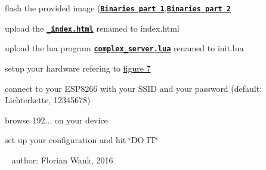\begin{DoxyItemize}
\item flash the provided image (\href{0x00000.bin}{\tt {\bfseries Binaries part 1}},\href{0x10000.bin}{\tt {\bfseries Binaries part 2}} 
\item upload the \href{_index.html}{\tt {\bfseries \+\_\+index.\+html}} renamed to index.\+html 
\item upload the lua program \href{complex_server.lua}{\tt {\bfseries complex\+\_\+server.\+lua}} renamed to init.\+lua 
\item setup your hardware refering to \hyperlink{index_seven}{figure 7} 
\item connect to your E\+S\+P8266 with your S\+S\+I\+D and your password (default\+: Lichterkette, 12345678) 
\item browse 192... on your device 
\item set up your configuration and hit \char`\"{}\+D\+O I\+T\char`\"{} 
\end{DoxyItemize}~\newline
 author\+: Florian Wank, 2016 